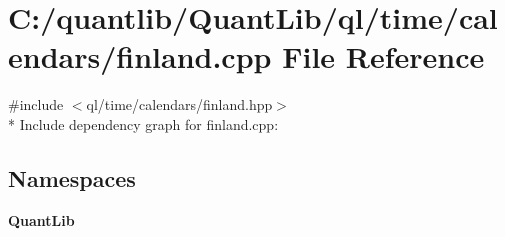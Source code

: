\section{C\+:/quantlib/\+Quant\+Lib/ql/time/calendars/finland.cpp File Reference}
\label{finland_8cpp}
{\ttfamily \#include $<$ql/time/calendars/finland.\+hpp$>$}\\*
Include dependency graph for finland.\+cpp\+:
\subsection*{Namespaces}
\begin{DoxyCompactItemize}
\item 
 {\bf Quant\+Lib}
\end{DoxyCompactItemize}
